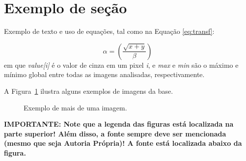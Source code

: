 \section{Exemplo de seção}
\label{sec:exampleSection}

Exemplo de texto e uso de equações, tal como na Equação \ref{eq:transf}:
 
 \begin{equation}
    \alpha = \left( \dfrac{\sqrt{x+y}}{\beta} \right )
    \label{eq:transf}
\end{equation}
\noindent em que \textit{value[i]} é o valor de cinza em um pixel \textit{i}, e \textit{max} e \textit{min} são o máximo e mínimo global entre todas as imagens analisadas, respectivamente.

A Figura~\ref{fig:exemple02} ilustra alguns exemplos de imagens da base.

 \begin{figure}[!htb]
    \caption{Exemplo de mais de uma imagem.}
    \hfill
    \hfill
     \label{fig:exemple02}
\end{figure}

\textbf{IMPORTANTE: Note que a legenda das figuras está localizada na parte superior! Além disso, a fonte sempre deve ser mencionada (mesmo que seja Autoria Própria)! A fonte está localizada abaixo da figura.}



